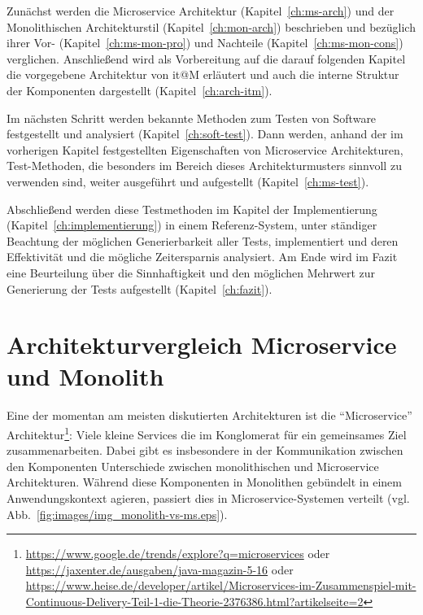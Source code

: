 \documentclass[12pt,a4paper,bibliography=totocnumbered,listof=totocnumbered]{scrartcl}
\begin{document}
Zunächst werden die Microservice Architektur (Kapitel~\ref{ch:ms-arch}) und der Monolithischen Architekturstil (Kapitel~\ref{ch:mon-arch}) beschrieben und bezüglich ihrer Vor- (Kapitel~\ref{ch:ms-mon-pro}) und Nachteile (Kapitel~\ref{ch:ms-mon-cons}) verglichen. Anschließend wird als Vorbereitung auf die darauf folgenden Kapitel die vorgegebene Architektur von it@M erläutert und auch die interne Struktur der Komponenten dargestellt (Kapitel~\ref{ch:arch-itm}).

Im nächsten Schritt werden bekannte Methoden zum Testen von Software festgestellt und analysiert (Kapitel~\ref{ch:soft-test}). Dann werden, anhand der im vorherigen Kapitel festgestellten Eigenschaften von Microservice Architekturen, Test-Methoden, die besonders im Bereich dieses Architekturmusters sinnvoll zu verwenden sind, weiter ausgeführt und aufgestellt (Kapitel~\ref{ch:ms-test}).

Abschließend werden diese Testmethoden im Kapitel der Implementierung (Kapitel~\ref{ch:implementierung}) in einem Referenz-System, unter ständiger Beachtung der möglichen Generierbarkeit aller Tests, implementiert und deren Effektivität und die mögliche Zeitersparnis analysiert. Am Ende wird im Fazit eine Beurteilung über die Sinnhaftigkeit und den möglichen Mehrwert zur Generierung der Tests aufgestellt (Kapitel~\ref{ch:fazit}).

\section{Architekturvergleich Microservice und Monolith}

Eine der momentan am meisten diskutierten Architekturen ist die \enquote{Microservice} Architektur\footnote{\url{https://www.google.de/trends/explore?q=microservices} oder \url{https://jaxenter.de/ausgaben/java-magazin-5-16} oder \url{https://www.heise.de/developer/artikel/Microservices-im-Zusammenspiel-mit-Continuous-Delivery-Teil-1-die-Theorie-2376386.html?artikelseite=2}}: Viele kleine Services die im Konglomerat für ein gemeinsames Ziel zusammenarbeiten. Dabei gibt es insbesondere in der Kommunikation zwischen den Komponenten Unterschiede zwischen monolithischen und Microservice Architekturen. Während diese Komponenten in Monolithen gebündelt in einem Anwendungskontext agieren, passiert dies in Microservice-Systemen verteilt (vgl. Abb.~\ref{fig:images/img_monolith-vs-ms.eps}).
\end{document}
